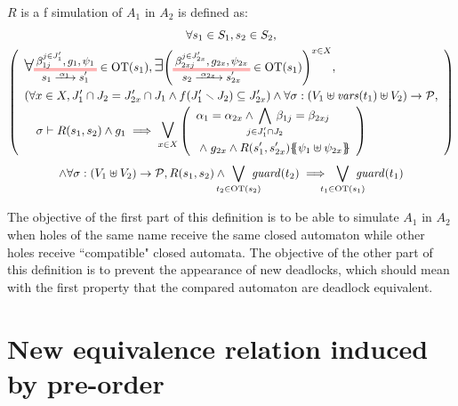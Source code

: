 \documentclass{article}
\begin{document}
\begin{defi}[f simulation]
\(R\) is a f simulation of \(A_1\) in \(A_2\) is defined as:
\begin{multline*}
	\forall s_1 \in S_1, s_2 \in S_2, \\
	\mpar{\renewcommand\arraystretch{1.4}\everymath{\displaystyle}\begin{array}{l}
		\bigsymb{\forall} \OTx{1}{}{1}{1} \in \fOT{s_1}, \bigsymb{\exists} \mpar{\OTx{2}{x}{2x}{2x} \in \fOT{s_1}}^{x \in X}, \\
		\mpar{\forall x \in X, J'_1 \cap J_2 = J'_{2x} \cap J_1 \wedge f\mpar{J'_1 \setminus J_2} \subseteq J'_{2x}} \wedge \forall \sigma: \mpar{V_1 \uplus \fvars{t_1} \uplus V_2} \to \values, \\
		\quad \sigma \vdash R\mpar{s_1, s_2} \wedge g_1 \implies \operatorname*{\bigsymb{\bigvee}}_{x \in X} \mpar{\begin{array}{l}
			\alpha_1 = \alpha_{2x} \wedge \bigwedge_\subbox{j \in J'_1 \cap J_2} \beta_{1j} = \beta_{2xj} \\
			\nwedge g_{2x} \wedge R\mpar{s'_1, s'_{2x}}\psubst{\psi_1 \uplus \psi_{2x}}
		\end{array}} \\
	\end{array}} \\
	\wedge \forall \sigma: \mpar{V_1 \uplus V_2} \to \values, R\mpar{s_1, s_2} \wedge \bigvee_\subbox{t_2 \in \fOT{s_2}} \fguard{t_2} \implies \bigvee_\subbox{t_1 \in \fOT{s_1}} \fguard{t_1}
\end{multline*}
\end{defi}
The objective of the first part of this definition is to be able to simulate \(A_1\) in \(A_2\) when holes of the same name receive the same closed automaton while other holes receive ``compatible" closed automata.
The objective of the other part of this definition is to prevent the appearance of new deadlocks, which should mean with the first property that the compared automaton are deadlock equivalent.


\section{New equivalence relation induced by pre-order}
\end{document}
